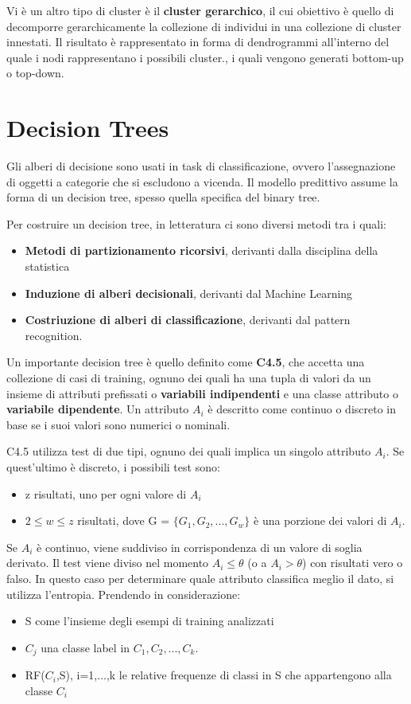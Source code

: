 \documentclass[a4paper]{extarticle}
\begin{document}
Vi è un altro tipo di cluster è il \textbf{cluster gerarchico}, il cui obiettivo è quello di decomporre gerarchicamente la collezione di individui in una collezione di cluster innestati. Il risultato è rappresentato in forma di dendrogrammi all'interno del quale i nodi rappresentano i possibili cluster., i quali vengono generati bottom-up o top-down.

\newpage

\section{Decision Trees}

Gli alberi di decisione sono usati in task di classificazione, ovvero l'assegnazione di oggetti a categorie che si escludono a vicenda. Il modello predittivo assume la forma di un decision tree, spesso quella specifica del binary tree.

Per costruire un decision tree, in letteratura ci sono diversi metodi tra i quali:
\begin{itemize}
\item \textbf{Metodi di partizionamento ricorsivi}, derivanti dalla disciplina della statistica
\item \textbf{Induzione di alberi decisionali}, derivanti dal Machine Learning
\item \textbf{Costriuzione di alberi di classificazione}, derivanti dal pattern recognition.
\end{itemize}

Un importante decision tree è quello definito come \textbf{C4.5}, che accetta una collezione di casi di training, ognuno dei quali ha una tupla di valori da un insieme di attributi prefissati o \textbf{variabili indipendenti} e una classe attributo o \textbf{variabile dipendente}. Un attributo $A_i$ è descritto come continuo o discreto in base se i suoi valori sono numerici o nominali.

C4.5 utilizza test di due tipi, ognuno dei quali implica un singolo attributo $A_i$. Se quest'ultimo è discreto, i possibili test sono:

\begin{itemize}
\item z risultati, uno per ogni valore di $A_i$
\item $2 \leq w \leq z$ risultati, dove G = $\{ G_1,G_2,...,G_w\}$ è una porzione dei valori di $A_i$.
\end{itemize}

Se $A_i$ è continuo, viene suddiviso in corrispondenza di un valore di soglia derivato. Il test viene diviso nel momento $A_i \leq \theta$ (o a $A_i > \theta$) con risultati vero o falso. In questo caso per determinare quale attributo classifica meglio il dato, si utilizza l'entropia. Prendendo in considerazione:
\begin{itemize}
\item S come l'insieme degli esempi di training analizzati
\item $C_j$ una classe label in $C_1,C_2,...,C_k$.
\item RF($C_i$,S), i=1,...,k le relative frequenze di classi in S che appartengono alla classe $C_i$
\end{itemize}
\end{document}
